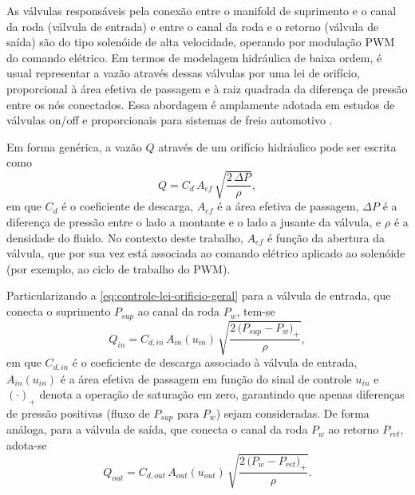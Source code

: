As válvulas responsáveis pela conexão entre o manifold de suprimento e o canal da roda (válvula de entrada) e entre o canal da roda e o retorno (válvula de saída) são do tipo solenóide de alta velocidade, operando por modulação PWM do comando elétrico. Em termos de modelagem hidráulica de baixa ordem, é usual representar a vazão através dessas válvulas por uma lei de orifício, proporcional à área efetiva de passagem e à raiz quadrada da diferença de pressão entre os nós conectados. Essa abordagem é amplamente adotada em estudos de válvulas on/off e proporcionais para sistemas de freio automotivo \cite{Development-of-Proportional-Pressure-Control-Valve-for-Hydraulic-Braking-Actuator-of-Automobile-ABS.pdf,Hardware-in-the-loop-simulation-of-pressure-difference-limiting-modulation-of-the-hydraulic-brake-for-regenerative-braking-control-of-electric-vehicles.pdf,OK-High-Precision_Hydraulic_Pressure_Control_Based_on_Linear_Pressure-Drop_Modulation_in_Valve_Critical_Equilibrium_State.pdf,PressureCoordinatedControl2023}.

Em forma genérica, a vazão $Q$ através de um orifício hidráulico pode ser escrita como
\begin{equation}
    Q = C_d\,A_{ef}\,\sqrt{\frac{2\,\Delta P}{\rho}},
    \label{eq:controle-lei-orificio-geral}
\end{equation}
em que $C_d$ é o coeficiente de descarga, $A_{ef}$ é a área efetiva de passagem, $\Delta P$ é a diferença de pressão entre o lado a montante e o lado a jusante da válvula, e $\rho$ é a densidade do fluido. No contexto deste trabalho, $A_{ef}$ é função da abertura da válvula, que por sua vez está associada ao comando elétrico aplicado ao solenóide (por exemplo, ao ciclo de trabalho do PWM).

Particularizando a \eqref{eq:controle-lei-orificio-geral} para a válvula de entrada, que conecta o suprimento $P_{sup}$ ao canal da roda $P_w$, tem-se
\begin{equation}
    Q_{in} = C_{d,in}\,A_{in}(u_{in})\,\sqrt{\frac{2\,\big(P_{sup} - P_w\big)_{+}}{\rho}},
    \label{eq:controle-Qin}
\end{equation}
em que $C_{d,in}$ é o coeficiente de descarga associado à válvula de entrada, $A_{in}(u_{in})$ é a área efetiva de passagem em função do sinal de controle $u_{in}$ e $(\cdot)_{+}$ denota a operação de saturação em zero, garantindo que apenas diferenças de pressão positivas (fluxo de $P_{sup}$ para $P_w$) sejam consideradas. De forma análoga, para a válvula de saída, que conecta o canal da roda $P_w$ ao retorno $P_{ret}$, adota-se
\begin{equation}
    Q_{out} = C_{d,out}\,A_{out}(u_{out})\,\sqrt{\frac{2\,\big(P_{w} - P_{ret}\big)_{+}}{\rho}}.
    \label{eq:controle-Qout}
\end{equation}

